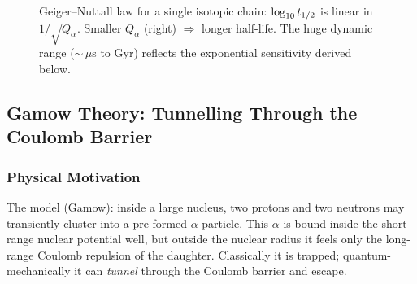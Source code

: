 \begin{figure}[h]
\centering
{}
\caption{Geiger--Nuttall law for a single isotopic chain: $\log_{10}t_{1/2}$ is
linear in $1/\sqrt{Q_\alpha}$.  Smaller $Q_\alpha$ (right) $\Rightarrow$ longer
half-life.  The huge dynamic range ($\sim$\,$\mu$s to Gyr) reflects the
exponential sensitivity derived below.}
\label{fig:lec08:gn}
\end{figure}

\subsection{Gamow Theory: Tunnelling Through the Coulomb Barrier}
\label{subsec:lec08:gamow}

\subsubsection*{Physical Motivation}
The model (Gamow): inside a large nucleus, two protons and two neutrons may
transiently cluster into a pre-formed $\alpha$ particle.  This $\alpha$ is bound
inside the short-range nuclear potential well, but outside the nuclear radius it
feels only the long-range Coulomb repulsion of the daughter.  Classically it is
trapped; quantum-mechanically it can \emph{tunnel} through the Coulomb barrier
and escape.

